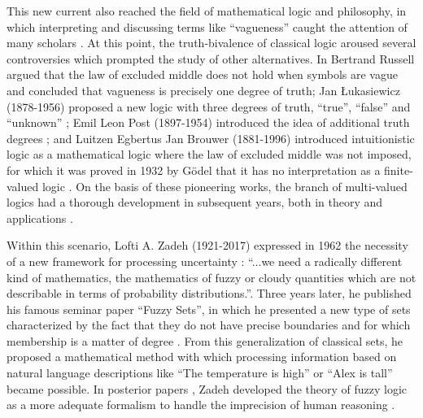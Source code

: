 This new current also reached the field of mathematical logic and philosophy, in which interpreting and discussing terms like ``vagueness'' caught the attention of many scholars \cite{Russell1923,Black1937,Hempel1939}. At this point, the truth-bivalence of classical logic aroused several controversies which prompted the study of other alternatives. In \cite{Russell1923} Bertrand Russell argued that the law of excluded middle does not hold when symbols are vague and concluded that vagueness is precisely one degree of truth; Jan Łukasiewicz (1878-1956) proposed a new logic with three degrees of truth, ``true'', ``false'' and ``unknown'' \cite{Lukasiewicz1920}; Emil Leon Post (1897-1954) introduced the idea of additional truth degrees \cite{Post1921}; and Luitzen Egbertus Jan Brouwer (1881-1996) introduced intuitionistic logic as a mathematical logic where the law of excluded middle was not imposed, for which it was proved in 1932 by Gödel that it has no interpretation as a finite-valued logic \cite{Godel1932}. On the basis of these pioneering works, the branch of multi-valued logics had a thorough development in subsequent years, both in theory and applications \cite{Gottwald2001}.

Within this scenario, Lofti A. Zadeh (1921-2017) expressed in 1962 the necessity of a new framework for processing uncertainty \cite{Zadeh1962}:  ``...we need a radically different kind of mathematics, the mathematics of fuzzy or cloudy quantities which are not describable in terms of probability distributions.''. Three years later, he published his famous seminar paper ``Fuzzy Sets'', in which he presented a new type of sets characterized by the fact that they do not have precise boundaries and for which membership is a matter of degree \cite{Zadeh1965}. From this generalization of classical sets, he proposed a mathematical method with which processing information based on natural language descriptions like ``The temperature is high'' or ``Alex is tall'' became possible. In posterior papers \cite{Klir1996}, Zadeh developed the theory of fuzzy logic as a more adequate formalism to handle the imprecision of human reasoning \cite{Dubois2016}.


